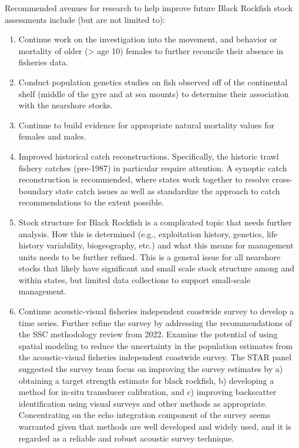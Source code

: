 \documentclass[11pt,
  english,
  letterpaper,
]{article}
\providecommand{\tightlist}{%
  \setlength{\itemsep}{0pt}\setlength{\parskip}{0pt}}
\providecommand{\tightlist}{%
  \setlength{\itemsep}{0pt}\setlength{\parskip}{0pt}}
\begin{document}
Recommended avenues for research to help improve future Black Rockfish stock assessments include (but are not limited to):

\begin{enumerate}
\def\labelenumi{\arabic{enumi}.}
\tightlist
\item
  Continue work on the investigation into the movement, and behavior or mortality of older (\textgreater{} age 10) females to further reconcile their absence in fisheries data.
\item
  Conduct population genetics studies on fish observed off of the continental shelf (middle of the gyre and at sea mounts) to determine their association with the nearshore stocks.
\item
  Continue to build evidence for appropriate natural mortality values for females and males.
\item
  Improved historical catch reconstructions. Specifically, the historic trawl fishery catches (pre-1987) in particular require attention. A synoptic catch reconstruction is recommended, where states work together to resolve cross-boundary state catch issues as well as standardize the approach to catch recommendations to the extent possible.
\item
  Stock structure for Black Rockfish is a complicated topic that needs further analysis. How this is determined (e.g., exploitation history, genetics, life history variability, biogeography, etc.) and what this means for management units needs to be further refined. This is a general issue for all nearshore stocks that likely have significant and small scale stock structure among and within states, but limited data collections to support small-scale management.
\item
  Continue acoustic-visual fisheries independent coastwide survey to develop a time series. Further refine the survey by addressing the recommendations of the SSC methodology review from 2022. Examine the potential of using spatial modeling to reduce the uncertainty in the population estimates from the acoustic-visual fisheries independent coastwide survey. The STAR panel suggested the survey team focus on improving the survey estimates by a) obtaining a target strength estimate for black rockfish, b) developing a method for in-situ transducer calibration, and c) improving backscatter identification using visual surveys and other methods as appropriate. Concentrating on the echo integration component of the survey seems warranted given that methods are well developed and widely used, and it is regarded as a reliable and robust acoustic survey technique.

\end{enumerate}
\end{document}
